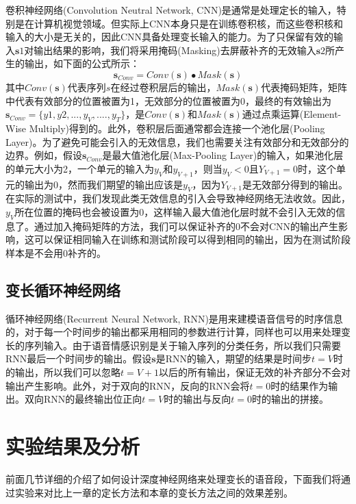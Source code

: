 卷积神经网络(Convolution Neutral Network, CNN)是通常是处理定长的输入，特别是在计算机视觉领域。但实际上CNN本身只是在训练卷积核，而这些卷积核和输入的大小是无关的，因此CNN具备处理变长输入的能力。为了只保留有效的输入$\mathbf{s}1$对输出结果的影响，我们将采用掩码(Masking)去屏蔽补齐的无效输入$\mathbf{s}2$所产生的输出，如下面的公式所示：
\begin{equation}
\label{equ:cnn_mask}
    \mathbf{s}_{Conv} = Conv(\mathbf{s}) \bullet Mask(\mathbf{s})
\end{equation}
其中$Conv(\mathbf{s})$代表序列$s$在经过卷积层后的输出，$Mask(\mathbf{s})$代表掩码矩阵，矩阵中代表有效部分的位置被置为1，无效部分的位置被置为0，最终的有效输出为$\mathbf{s}_{Conv}=\{y1,y2,...,y_V,....,y_T\}$，是$Conv(\mathbf{s})$和$Mask(\mathbf{s})$通过点乘运算(Element-Wise Multiply)得到的。此外，卷积层后面通常都会连接一个池化层(Pooling Layer)。为了避免可能会引入的无效信息，我们也需要关注有效部分和无效部分的边界。例如，假设$\mathbf{s}_{Conv}$是最大值池化层(Max-Pooling Layer)的输入，如果池化层的单元大小为2，一个单元的输入为$y_V$和$y_{V+1}$，则当$y_V<0$且$Y_{V+1}=0$时，这个单元的输出为0，然而我们期望的输出应该是$y_V$，因为$Y_{V+1}$是无效部分得到的输出。在实际的测试中，我们发现此类无效信息的引入会导致神经网络无法收敛。因此，$y_V$所在位置的掩码也会被设置为0，这样输入最大值池化层时就不会引入无效的信息了。通过加入掩码矩阵的方法，我们可以保证补齐的0不会对CNN的输出产生影响，这可以保证相同输入在训练和测试阶段可以得到相同的输出，因为在测试阶段样本是不会用0补齐的。

\subsection{变长循环神经网络}
\label{ssec:var_len_rnn}

循环神经网络(Recurrent Neural Network, RNN)是用来建模语音信号的时序信息的，对于每一个时间步的输出都采用相同的参数进行计算，同样也可以用来处理变长的序列输入。由于语音情感识别是关于输入序列的分类任务，所以我们只需要RNN最后一个时间步的输出。假设$\mathbf{s}$是RNN的输入，期望的结果是时间步$t=V$时的输出，所以我们可以忽略$t=V+1$以后的所有输出，保证无效的补齐部分不会对输出产生影响。此外，对于双向的RNN，反向的RNN会将$t=0$时的结果作为输出。双向RNN的最终输出位正向$t=V$时的输出与反向$t=0$时的输出的拼接。

\section{实验结果及分析}
\label{sec:var_len_experiment}

前面几节详细的介绍了如何设计深度神经网络来处理变长的语音段，下面我们将通过实验来对比上一章的定长方法和本章的变长方法之间的效果差别。


